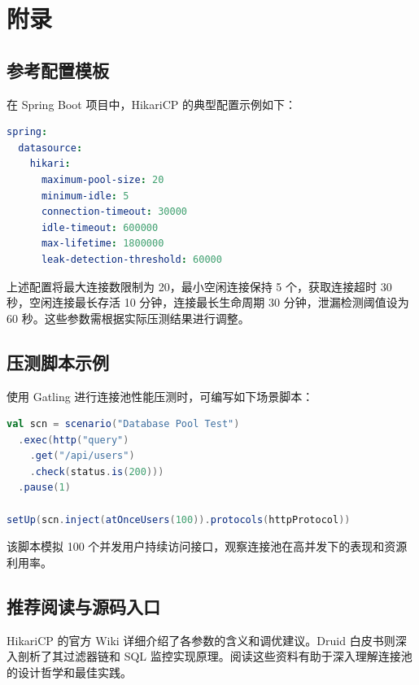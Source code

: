 \chapter{附录}
\section{参考配置模板}
在 Spring Boot 项目中，HikariCP 的典型配置示例如下：\par
\begin{lstlisting}[language=yaml]
spring:
  datasource:
    hikari:
      maximum-pool-size: 20
      minimum-idle: 5
      connection-timeout: 30000
      idle-timeout: 600000
      max-lifetime: 1800000
      leak-detection-threshold: 60000
\end{lstlisting}
上述配置将最大连接数限制为 20，最小空闲连接保持 5 个，获取连接超时 30 秒，空闲连接最长存活 10 分钟，连接最长生命周期 30 分钟，泄漏检测阈值设为 60 秒。这些参数需根据实际压测结果进行调整。\par
\section{压测脚本示例}
使用 Gatling 进行连接池性能压测时，可编写如下场景脚本：\par
\begin{lstlisting}[language=scala]
val scn = scenario("Database Pool Test")
  .exec(http("query")
    .get("/api/users")
    .check(status.is(200)))
  .pause(1)

setUp(scn.inject(atOnceUsers(100)).protocols(httpProtocol))
\end{lstlisting}
该脚本模拟 100 个并发用户持续访问接口，观察连接池在高并发下的表现和资源利用率。\par
\section{推荐阅读与源码入口}
HikariCP 的官方 Wiki 详细介绍了各参数的含义和调优建议。Druid 白皮书则深入剖析了其过滤器链和 SQL 监控实现原理。阅读这些资料有助于深入理解连接池的设计哲学和最佳实践。\par
